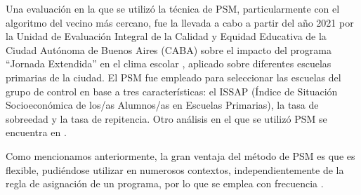 \documentclass[../../main.tex]{subfiles}
\begin{document}

\medskip

Una evaluación en la que se utilizó la técnica de PSM, particularmente con el algoritmo
del vecino más cercano, fue la llevada a cabo a partir del año 2021 por la Unidad de
Evaluación Integral de la Calidad y Equidad Educativa de la Ciudad Autónoma de Buenos
Aires (CABA) sobre el impacto del programa ``Jornada Extendida'' en el clima escolar
\cite{ueicee2023jornada}, aplicado sobre diferentes escuelas primarias de la ciudad. El
PSM fue empleado para seleccionar las escuelas del grupo de control en base a tres
características: el ISSAP (Índice de Situación Socioeconómica de los/as Alumnos/as en
Escuelas Primarias), la tasa de sobreedad y la tasa de repitencia. Otro análisis en el
que se utilizó PSM se encuentra en \cite{psm-case-maternal-healthcare}.

Como mencionamos anteriormente, la gran ventaja del método de PSM es que es flexible,
pudiéndose utilizar en numerosos contextos, independientemente de la regla de asignación
de un programa, por lo que se emplea con frecuencia \cite{bernal}.
\end{document}
